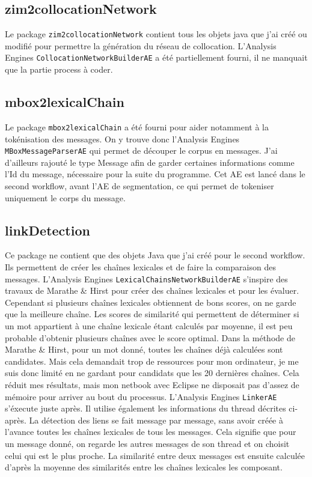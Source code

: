 \documentclass[a4paper]{article}
\begin{document}
	\subsection{zim2collocationNetwork}
	Le package \texttt{zim2collocationNetwork} contient tous les objets java que j'ai créé ou modifié pour permettre la génération du réseau de collocation. L'Analysis Engines \texttt{CollocationNetworkBuilderAE} a été partiellement fourni, il ne manquait que la partie process à coder.

	\subsection{mbox2lexicalChain}
	Le package \texttt{mbox2lexicalChain} a été fourni pour aider notamment à la tokénisation des messages. On y trouve donc l'Analysis Engines \texttt{MBoxMessageParserAE} qui permet de découper le corpus en messages. J'ai d'ailleurs rajouté le type Message afin de garder certaines informations comme l’Id du message, nécessaire pour la suite du programme. Cet AE est lancé dans le second workflow, avant l'AE de segmentation, ce qui permet de tokeniser uniquement le corps du message.

	\subsection{linkDetection}
	Ce package ne contient que des objets Java que j'ai créé pour le second workflow. Ils permettent de créer les chaînes lexicales et de faire la comparaison des messages. L'Analysis Engines \texttt{LexicalChainsNetworkBuilderAE} s’inspire des travaux de Marathe \& Hirst pour créer des chaînes lexicales et pour les évaluer. Cependant si plusieurs chaînes lexicales obtiennent de bons scores, on ne garde que la meilleure chaîne. Les scores de similarité qui permettent de déterminer si un mot appartient à une chaîne lexicale étant calculés par moyenne, il est peu probable d’obtenir plusieurs chaînes avec le score optimal. Dans la méthode de Marathe \& Hirst, pour un mot donné, toutes les chaînes déjà calculées sont candidates. Mais cela demandait trop de ressources pour mon ordinateur, je me suis donc limité en ne gardant pour candidats que les 20 dernières chaînes. Cela réduit mes résultats, mais mon netbook avec Eclipse ne disposait pas d'assez de mémoire pour arriver au bout du processus. L'Analysis Engines \texttt{LinkerAE} s'éxecute juste après. Il utilise également les informations du thread décrites ci-après. La détection des liens se fait message par message, sans avoir créée à l'avance toutes les chaînes lexicales de tous les messages. Cela signifie que pour un message donné, on regarde les autres messages de son thread et on choisit celui qui est le plus proche. La similarité entre deux messages est ensuite calculée d’après la moyenne des similarités entre les chaînes lexicales les composant.
\end{document}
